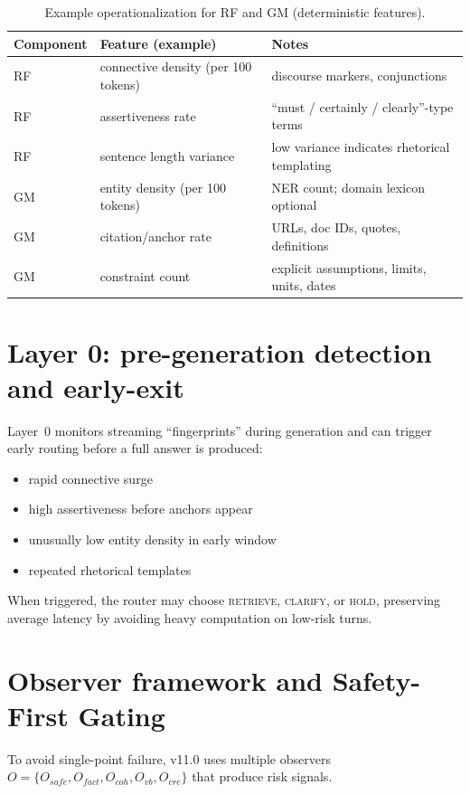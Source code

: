 \documentclass[11pt,a4paper]{article}
\begin{document}
\begin{table}[h]
\centering
\caption{Example operationalization for RF and GM (deterministic features).}
\label{tab:features}
\begin{tabular}{@{}lll@{}}
\toprule
Component & Feature (example) & Notes \\
\midrule
RF & connective density (per 100 tokens) & discourse markers, conjunctions \\
RF & assertiveness rate & ``must / certainly / clearly''-type terms \\
RF & sentence length variance & low variance indicates rhetorical templating \\
GM & entity density (per 100 tokens) & NER count; domain lexicon optional \\
GM & citation/anchor rate & URLs, doc IDs, quotes, definitions \\
GM & constraint count & explicit assumptions, limits, units, dates \\
\bottomrule
\end{tabular}
\end{table}

\section{Layer 0: pre-generation detection and early-exit}

Layer~0 monitors streaming ``fingerprints'' during generation and can trigger early routing
before a full answer is produced:
\begin{itemize}
\item rapid connective surge
\item high assertiveness before anchors appear
\item unusually low entity density in early window
\item repeated rhetorical templates
\end{itemize}
When triggered, the router may choose \textsc{retrieve}, \textsc{clarify}, or
\textsc{hold}, preserving average latency by avoiding heavy computation on low-risk turns.

\section{Observer framework and Safety-First Gating}

To avoid single-point failure, v11.0 uses multiple observers
$O = \{O_{safe}, O_{fact}, O_{coh}, O_{vb}, O_{cre}\}$ that produce risk signals.
\end{document}
